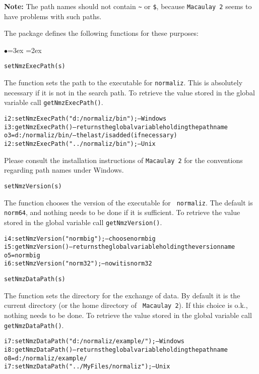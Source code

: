 \documentclass[11pt]{amsart}
\newenvironment{example}
  {\begin{alltt}\small}
  {\end{alltt}}
\newenvironment{functions}
  {\begin{list}{$\bullet$}{\leftmargin=3ex \labelwidth=2ex
  \listparindent=0pt \itemsep=6pt \parsep=3pt}}
  {\end{list}}
\begin{document}
\textbf{Note:} The path names should not contain \verb+~+ or \verb+$+,
because {\tt Macaulay 2} seems to have problems with such paths.

The package defines the following functions for these purposes:

\begin{functions}
\item \verb+setNmzExecPath(s)+

The function sets the path to the executable for {\tt normaliz}.
This is absolutely necessary if it is not in the search path. To retrieve 
the value stored in the global variable call \verb+getNmzExecPath()+.
\begin{example}
i2 : setNmzExecPath("d:/normaliz/bin"); -- Windows
i3 : getNmzExecPath()  -- returns the global variable holding the path name
o3 = d:/normaliz/bin/  -- the last / is added (if necessary)
i2 : setNmzExecPath("../normaliz/bin");  -- Unix
\end{example}
Please consult the installation instructions of {\tt Macaulay 2} for
the conventions regarding path names under Windows.


\item \verb+setNmzVersion(s)+

The function chooses the version of the executable for {\tt
normaliz}. The default is {\tt norm64}, and nothing needs to be done
if it is sufficient. To retrieve the value stored in the global
 variable call \verb+getNmzVersion()+.
\begin{example}
i4 : setNmzVersion("normbig"); -- choose normbig
i5 : getNmzVersion()       -- returns the global variable holding the version name
o5 = normbig
i6 : setNmzVersion("norm32");  -- now it is norm32
\end{example}


\item \verb+setNmzDataPath(s)+

The function sets the directory for the exchange of data. By
default it is the current directory (or the home directory of {\tt
Macaulay 2}). If this choice is o.k., nothing needs to be done.
To retrieve the value stored in the global  variable call \verb+getNmzDataPath()+.
\begin{example}
i7 : setNmzDataPath("d:/normaliz/example/"); -- Windows
i8 : getNmzDataPath()       -- returns the global variable holding the path name
o8 = d:/normaliz/example/
i7 : setNmzDataPath("../MyFiles/normaliz");  -- Unix
\end{example}


\end{functions}
\end{document}
